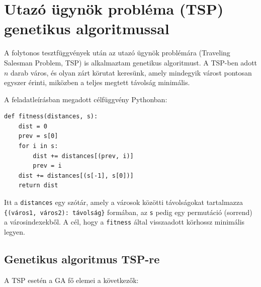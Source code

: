 \documentclass[a4paper,12pt]{article}
\begin{document}
\section{Utazó ügynök probléma (TSP) genetikus algoritmussal}

A folytonos tesztfüggvények után az utazó ügynök problémára (Traveling
Salesman Problem, TSP) is alkalmaztam genetikus algoritmust. A TSP-ben adott
$n$ darab város, és olyan zárt körutat keresünk, amely mindegyik várost
pontosan egyszer érinti, miközben a teljes megtett távolság minimális.

A feladatleírásban megadott célfüggvény Pythonban:

\begin{verbatim}
def fitness(distances, s):
    dist = 0
    prev = s[0]
    for i in s:
        dist += distances[(prev, i)]
        prev = i
    dist += distances[(s[-1], s[0])]
    return dist
\end{verbatim}

Itt a \texttt{distances} egy szótár, amely a városok közötti távolságokat
tartalmazza \verb|{(város1, város2): távolság}| formában, az
\texttt{s} pedig egy permutáció (sorrend) a városindexekből. A cél, hogy a
\texttt{fitness} által visszaadott körhossz minimális legyen.

\subsection{Genetikus algoritmus TSP-re}

A TSP esetén a GA fő elemei a következők:
\end{document}
